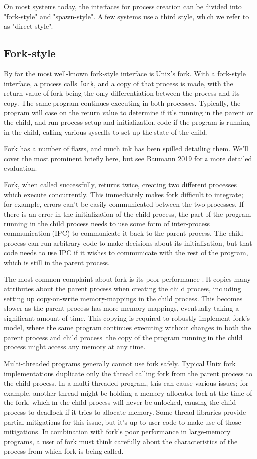 \documentclass[sigplan]{acmart}
\begin{document}
On most systems today,
the interfaces for process creation
can be divided into "fork-style" and "spawn-style".
A few systems use a third style, which we refer to as "direct-style".
\subsection{Fork-style}
By far the most well-known fork-style interface is Unix's fork.\cite{forkhist}
With a fork-style interface,
a process calls \texttt{fork}, and a copy of that process is made,
with the return value of fork being the only differentiation between the process and its copy.
The same program continues executing in both processes.
Typically, the program will case on the return value to determine if it's running in the parent or the child,
and run process setup and initialization code if the program is running in the child,
calling various syscalls to set up the state of the child.

Fork has a number of flaws,
and much ink has been spilled detailing them.
We'll cover the most prominent briefly here,
but see Baumann 2019 \cite{forkroad} for a more detailed evaluation.

Fork, when called successfully, returns twice,
creating two different processes which execute concurrently.
This immediately makes fork difficult to integrate;
for example, errors can't be easily communicated between the two processes.
If there is an error in the initialization of the child process,
the part of the program running in the child process
needs to use some form of inter-process communication (IPC) to communicate it back to the parent process.
The child process can run arbitrary code to make decisions about its initialization,
but that code needs to use IPC if it wishes to communicate with the rest of the program,
which is still in the parent process.

The most common complaint about fork is its poor performance \cite{forkroad}.
It copies many attributes about the parent process when creating the child process,
including setting up copy-on-write memory-mappings in the child process.
This becomes slower as the parent process has more memory-mappings,
eventually taking a significant amount of time.
This copying is required to robustly implement fork's model,
where the same program continues executing without changes in both the parent process and child process;
the copy of the program running in the child process might access any memory at any time.

Multi-threaded programs generally cannot use fork safely.
Typical Unix fork implementations duplicate only the thread calling fork from the parent process to the child process.
In a multi-threaded program, this can cause various issues;
for example, another thread might be holding a memory allocator lock at the time of the fork,
which in the child process will never be unlocked,
causing the child process to deadlock if it tries to allocate memory.
Some thread libraries provide partial mitigations for this issue,
but it's up to user code to make use of those mitigations.
In combination with fork's poor performance in large-memory programs,
a user of fork must think carefully
about the characteristics of the process from which fork is being called.
\end{document}
